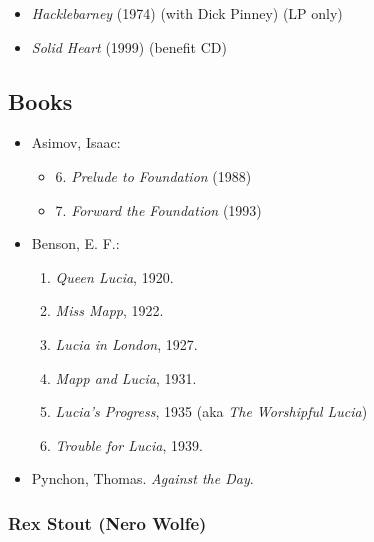 \documentclass[twocolumn]{article}
\begin{document}
\begin{itemize}

\item\emph{Hacklebarney} (1974) (with Dick Pinney) (LP only)
\item\emph{Solid Heart} (1999) (benefit CD)

\end{itemize}

\newpage

\subsection{Books}

\begin{itemize}

\item Asimov, Isaac:
\begin{itemize}
\item 6. \emph{Prelude to Foundation} (1988)
\item 7. \emph{Forward the Foundation} (1993)
\end{itemize}

\item Benson, E. F.:
\begin{enumerate}
\item[1.] \emph{Queen Lucia}, 1920.
\item[2.] \emph{Miss Mapp}, 1922.
\item[3.] \emph{Lucia in London}, 1927.
\item[4.] \emph{Mapp and Lucia}, 1931.
\item[5.] \emph{Lucia's Progress}, 1935 (aka \emph{The Worshipful Lucia})
\item[6.] \emph{Trouble for Lucia}, 1939.
\end{enumerate}

\item
Pynchon, Thomas.  \emph{Against the Day}.

\end{itemize}

\subsubsection{Rex Stout (Nero Wolfe)}
\end{document}
